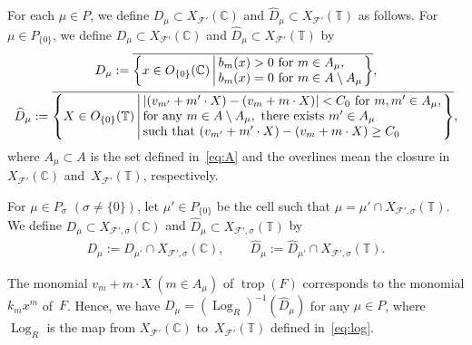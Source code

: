 \documentclass[pdftex]{sigma}
\numberwithin{equation}{section}
\begin{document}
\begin{Definition}\label{df:nbd} For each $\mu \in P$, we def\/ine $D_\mu \subset X_{{\mathcal F}'}({\mathbb C})$ and $\widehat{D}_\mu \subset X_{{\mathcal F}'}({\mathbb T})$ as follows. For $\mu \in P_{\{0\}}$, we def\/ine $D_\mu \subset X_{{\mathcal F}'}({\mathbb C})$ and $\widehat{D}_\mu \subset X_{{\mathcal F}'}({\mathbb T})$ by
\begin{gather*}
D_\mu:=
\overline{
\left\{ x \in O_{\{0\}}({\mathbb C}) \left|\,
\begin{array}{@{}l@{}}
b_{m}(x)>0\ {\rm for\ } m \in A_\mu, \\
b_{m}(x)=0\ {\rm for\ } m \in A \setminus A_\mu\\
\end{array}
\right.\right\}
},\\
\widehat{D}_\mu:=
\overline{
\left\{ X \in O_{\{0\}}({\mathbb T}) \left|\,
\begin{array}{@{}l@{}}
|(v_{m'}+m' \cdot X)-(v_{m}+m \cdot X)| < C_0\ {\rm for\ } m, m' \in A_\mu,\\
{\rm for\ any\ } m \in A \setminus A_\mu, {\rm \ there\ exists\ } m' \in A_\mu \\
{\rm such\ that\ } (v_{m'}+m' \cdot X)-(v_{m}+m \cdot X) \geq C_0 \\
\end{array}
\right.\right\}},
\end{gather*}
where $A_\mu \subset A$ is the set def\/ined in~\eqref{eq:A} and the overlines mean the closure in $X_{{\mathcal F}'}({\mathbb C})$ and~$X_{{\mathcal F}'}({\mathbb T})$, respectively.

For $\mu \in P_\sigma$ $(\sigma \neq \{0\})$, let $\mu' \in P_{\{0\}}$ be the cell such that $\mu = \mu' \cap X_{{\mathcal F}',\sigma}({\mathbb T})$. We def\/ine $D_\mu \subset X_{{\mathcal F}',\sigma}({\mathbb C})$ and $\widehat{D}_\mu \subset X_{{\mathcal F}',\sigma}({\mathbb T})$ by
\begin{gather}\label{eq:D}
D_\mu :=D_{\mu'} \cap X_{{\mathcal F}',\sigma}({\mathbb C}), \qquad \widehat{D}_\mu :=\widehat{D}_{\mu'} \cap X_{{\mathcal F}',\sigma}({\mathbb T}).
\end{gather}
\end{Definition}

The monomial $v_{m}+m \cdot X\ (m \in A_\mu)$ of $\operatorname{trop}(F)$ corresponds to the monomial $k_{m}x^{m}$ of~$F$. Hence, we have $D_\mu=(\operatorname{Log}_R)^{-1}(\widehat{D}_\mu)$ for any $\mu \in P$, where $\operatorname{Log}_R$ is the map from $X_{{\mathcal F}'}({\mathbb C})$ to~$X_{{\mathcal F}'}({\mathbb T})$ def\/ined in~\eqref{eq:log}.
\end{document}
